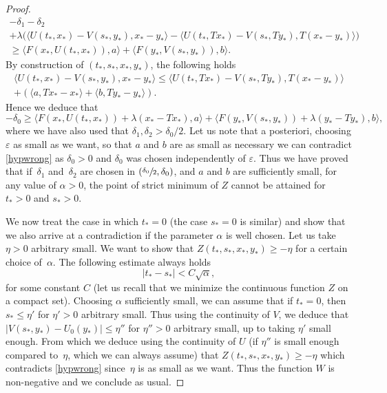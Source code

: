 \documentclass[JEP,XML,SOM,Unicode,NoEqCountersInSection,published]{cedram}
\let\epsilon\varepsilon
\theoremstyle{definition}
\begin{document}
\begin{proof}
\begin{multline}
- \delta_1 - \delta_2\\
+\lambda \bigl(\langle U(t_*,x_*)-V(s_*,y_*), x_* -y_*\rangle-\langle U(t_*,Tx_*)-V(s_*,Ty_*), T(x_*-y_*)\rangle\bigr) \\
\geq  \langle F(x_*,U(t_*,x_*)),a\rangle+\langle F(y_*,V(s_*,y_*)),b\rangle.
\end{multline}
By construction of $(t_*,s_*,x_*,y_*)$, the following holds
\begin{multline*}
\langle U(t_*,x_*)-V(s_*,y_*), x_* -y_*\rangle \leq \langle U(t_*,Tx_*)-V(s_*,Ty_*), T(x_*-y_*)\rangle \\
+ (\langle a, Tx_* -x_*\rangle+\langle b, Ty_* -y_*\rangle).
\end{multline*}
Hence we deduce that
\begin{equation*}
-\delta_0 \geq \langle F(x_*,U(t_*,x_*))+\lambda(x_*-Tx_*),a\rangle+\langle F(y_*,V(s_*,y_*))+\lambda(y_*-Ty_*),b\rangle,
\end{equation*}
where we have also used that $\delta_1,\delta_2 > \delta_0/2$. Let us note that a posteriori, choosing $\epsilon$ as small as we want, so that $a$ and $b$ are as small as necessary we can contradict \eqref{hypwrong} as $\delta_0 > 0$ and $\delta_0$ was chosen independently of $\epsilon$. Thus we have proved that if~$\delta_1$ and~$\delta_2$ are chosen in $(\sfrac{\delta_0}{2}, \delta_0)$, and $a$ and $b$ are sufficiently small, for any value of $\alpha > 0$, the point of strict minimum of $Z$ cannot be attained for $t_* > 0$ and $s_* > 0$.

We now treat the case in which $t_* = 0$ (the case $s_* = 0$ is similar) and show that we also arrive at a contradiction if the parameter $\alpha$ is well chosen. Let us take $\eta > 0$ arbitrary small. We want to show that $Z(t_*,s_*,x_*,y_*) \geq-\eta$ for a certain choice of~$\alpha$. The following estimate always holds
\begin{equation*}
|t_*-s_*|< C \sqrt{\alpha},
\end{equation*}
for some constant $C$ (let us recall that we minimize the continuous function $Z$ on a compact set). Choosing $\alpha$ sufficiently small, we can assume that if $t_* = 0$, then $s_* \leq \eta'$ for $\eta'>0$ arbitrary small. Thus using the continuity of $V$, we deduce that $|V(s_*,y_*)-U_0(y_*)|\leq \eta''$ for $\eta''>0$ arbitrary small, up to taking $\eta'$ small enough. From which we deduce using the continuity of $U$ (if $\eta''$ is small enough compared to~$\eta$, which we can always assume) that $Z(t_*,s_*,x_*,y_*) \geq-\eta$ which contradicts \eqref{hypwrong} since~$\eta$ is as small as we want. Thus the function $W$ is non-negative and we conclude as usual.
\end{proof}
\end{document}

